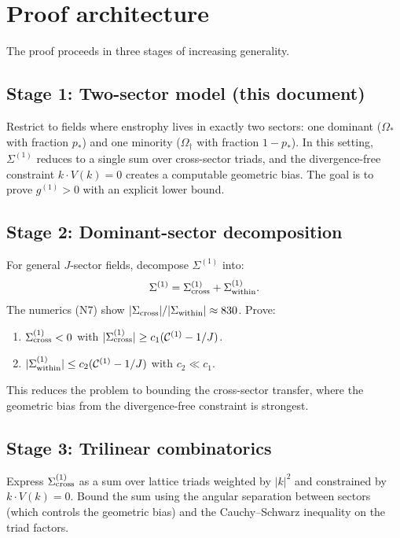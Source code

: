 \documentclass[11pt]{article}
\theoremstyle{definition}
\newcommand{\cC}{\mathcal{C}}
\begin{document}
\section{Proof architecture}

The proof proceeds in three stages of
increasing generality.

\subsection{Stage 1: Two-sector model (this document)}

Restrict to fields where enstrophy lives
in exactly two sectors: one dominant
($\Omega_*$ with fraction $p_*$) and one
minority ($\Omega_\dagger$ with fraction
$1-p_*$).  In this setting, $\Sigma^{(1)}$
reduces to a single sum over cross-sector
triads, and the divergence-free constraint
$k\cdot V(k)=0$ creates a computable
geometric bias.  The goal is to prove
$g^{(1)}>0$ with an explicit lower bound.

\subsection{Stage 2: Dominant-sector
decomposition}

For general $J$-sector fields, decompose
$\Sigma^{(1)}$ into:
\begin{equation}
\Sigma^{(1)} = \Sigma^{(1)}_{\rm cross}
+ \Sigma^{(1)}_{\rm within}.
\end{equation}
The numerics (N7) show
$|\Sigma_{\rm cross}|/|\Sigma_{\rm within}|
\approx 830$.  Prove:
\begin{enumerate}
\item[(a)] $\Sigma^{(1)}_{\rm cross}<0$
  with $|\Sigma^{(1)}_{\rm cross}|
  \geq c_1(\cC^{(1)}-1/J)$.
\item[(b)] $|\Sigma^{(1)}_{\rm within}|
  \leq c_2(\cC^{(1)}-1/J)$ with $c_2\ll c_1$.
\end{enumerate}
This reduces the problem to bounding the
cross-sector transfer, where the geometric
bias from the divergence-free constraint is
strongest.

\subsection{Stage 3: Trilinear combinatorics}

Express $\Sigma^{(1)}_{\rm cross}$ as a sum
over lattice triads weighted by $|k|^2$ and
constrained by $k\cdot V(k)=0$.  Bound the
sum using the angular separation between
sectors (which controls the geometric bias)
and the Cauchy--Schwarz inequality on the
triad factors.
\end{document}
